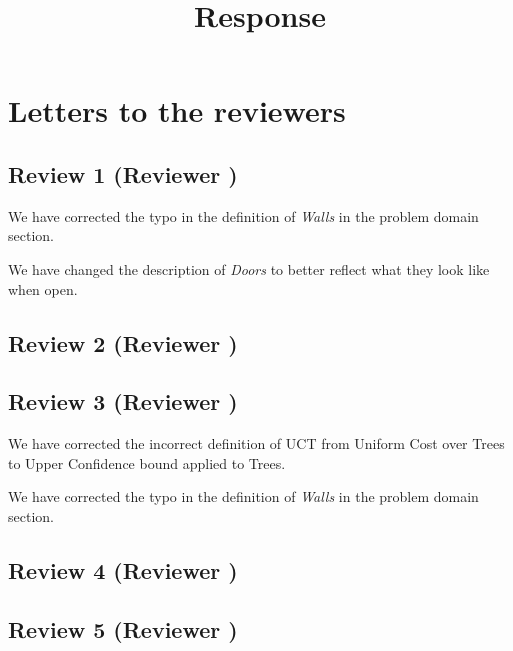 \documentclass{article}
\title{Response}
\begin{document}
\maketitle
\section{Letters to the reviewers}
\subsection{Review 1 (Reviewer )}
We have corrected the typo in the definition of \emph{Walls} in the problem domain section.

We have changed the description of \emph{Doors} to better reflect what they look like when open.
\subsection{Review 2 (Reviewer )}
\subsection{Review 3 (Reviewer )}
We have corrected the incorrect definition of UCT from Uniform Cost over Trees to Upper Confidence bound applied to Trees.

We have corrected the typo in the definition of \emph{Walls} in the problem domain section.
\subsection{Review 4 (Reviewer )}
\subsection{Review 5 (Reviewer )}
\end{document}
